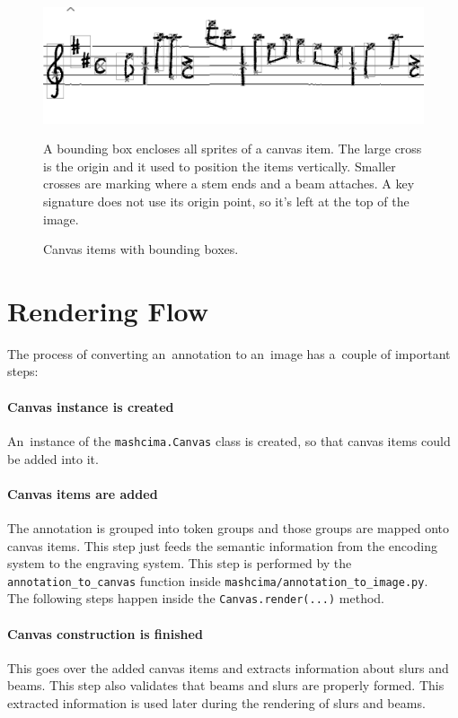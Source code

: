 \begin{figure}[h]
    \centering
    \includegraphics[width=140mm]{../img/canvas-items}
    \caption{Canvas items with bounding boxes.}
    \label{fig5:CanvasItems}
    \medskip
    \small
    A bounding box encloses all sprites of a canvas item. The large cross is the origin and it used to position the items vertically. Smaller crosses are marking where a stem ends and a beam attaches. A key signature does not use its origin point, so it's left at the top of the image.
\end{figure}


\section{Rendering Flow}

The process of converting an~annotation to an~image has a~couple of important steps:

\paragraph{Canvas instance is created} An~instance of the \verb`mashcima.`\allowbreak\verb`Canvas` class is created, so that canvas items could be added into it.

\paragraph{Canvas items are added} The annotation is grouped into token groups and those groups are mapped onto canvas items. This step just feeds the semantic information from the encoding system to the engraving system. This step is performed by the \verb`annotation_`\allowbreak\verb`to_canvas` function inside \verb`mashcima/`\allowbreak\verb`annotation_`\allowbreak\verb`to_image.py`.
\\

The following steps happen inside the \verb`Canvas`\allowbreak\verb`.render(...)` method.

\paragraph{Canvas construction is finished} This goes over the added canvas items and extracts information about slurs and beams. This step also validates that beams and slurs are properly formed. This extracted information is used later during the rendering of slurs and beams.

